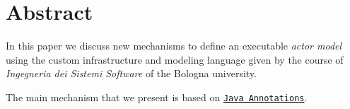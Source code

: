 \section*{Abstract}

In this paper we discuss new mechanisms to define an executable \textit{actor model} using the custom infrastructure and modeling language given by the course of \textit{Ingegneria dei Sistemi Software} of the Bologna university.

The main mechanism that we present is based on \href{https://docs.oracle.com/javase/tutorial/java/annotations/}{\texttt{Java Annotations}}.